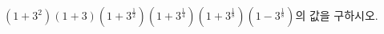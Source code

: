 $(1+3^2)(1+3)(1+3^{\frac{1}{2}})(1+3^{\frac{1}{4}})(1+3^{\frac{1}{8}})(1-3^{\frac{1}{8}})$의 값을 구하시오.
